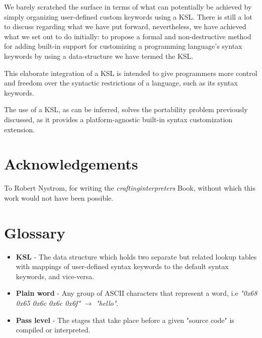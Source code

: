 \documentclass{article}
\begin{document}
We barely scratched the surface in terms of what can potentially be achieved by simply organizing user-defined custom keywords using a KSL. There is still a lot to discuss regarding what we have put forward, nevertheless, we have achieved what we set out to do initially: to propose a formal and non-destructive method for adding built-in support for customizing a programming language's syntax keywords by using a data-structure we have termed the KSL.
  
This elaborate integration of a KSL is intended to give programmers more control and freedom over the syntactic restrictions of a language, such as its syntax keywords.
  
The use of a KSL, as can be inferred, solves the portability problem previously discussed, as it provides a platform-agnostic built-in syntax customization extension.

\section*{Acknowledgements}
To Robert Nystrom, for writing the \textit{craftinginterpreters} \cite{CI} Book, without which this work would not have been possible.

\section*{Glossary}

\begin{itemize}
	\item \textbf{KSL} - The data structure which holds two separate but related lookup tables with mappings of user-defined syntax keywords to the default syntax keywords, and vice-versa.
	\item \textbf{Plain word} - Any group of ASCII characters that represent a word, i.e \textit{"0x68 0x65 0x6c 0x6c 0x6f"} $\rightarrow$ \textit{"hello"}.
	\item \textbf{Pass level} - The stages that take place before a given "source code" is compiled or interpreted.
\end{itemize}



\end{document}
